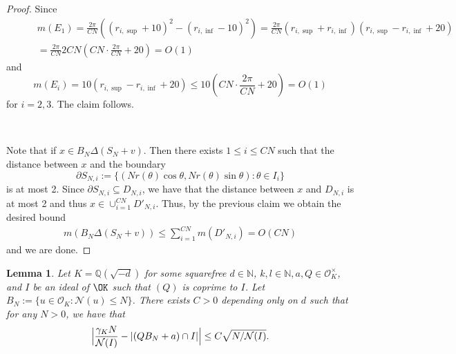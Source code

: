 \documentclass[11pt]{amsart}
\newtheorem{lemma}{Lemma}[section]
\theoremstyle{definition}
\newcommand{\N}{{\mathbb N}}
\newcommand{\NN}{{\mathcal N}}
\newcommand{\Q}{{\mathbb Q}}
\newcommand{\WS}[1]{{\color{blue}{{#1}}}}
\begin{document}
\begin{proof}
Since
\begin{equation*}
    \begin{split}
        \qquad &
        m(E_{1})=\frac{2\pi}{CN}((r_{i,\sup}+10)^{2}-(r_{i,\inf}-10)^{2})
        =\frac{2\pi}{CN}(r_{i,\sup}+r_{i,\inf})(r_{i,\sup}-r_{i,\inf}+20)
       \\& = \frac{2\pi}{CN}2CN(CN\cdot\frac{2\pi}{CN}+20)=O(1)
    \end{split}
\end{equation*}
and
$$m(E_{i})=10 (r_{i,\sup}-r_{i,\inf}+20)\leq 10 (CN\cdot\frac{2\pi}{CN}+20)=O(1)$$
for $i=2,3$. The claim follows.

\


Note that if $x\in B_{N}\Delta (S_{N}+v)$. Then there exists $1\leq i\leq CN$ such that the distance between $x$ and the boundary
$$\partial S_{N,i}:=\{(Nr(\theta)\cos\theta,Nr(\theta)\sin\theta)\colon \theta\in I_{i}\}$$ is at most 2. Since $\partial  S_{N,i}\subseteq D_{N,i}$, we have that the distance between $x$ and $D_{N,i}$ is at most 2 and thus $x\in\cup_{i=1}^{CN}D'_{N,i}$.
Thus, by the previous claim we obtain the desired bound
\begin{equation*}
    \begin{split}
        m(B_{N}\Delta (S_{N}+v))\leq \sum_{i=1}^{CN}m(D'_{N,i})=O(CN)%
    \end{split}
\end{equation*}
and we are done. %
 \end{proof}
 

\begin{lemma}\label{countingCRT}
Let $K=\Q(\sqrt{-d})$ for some squarefree $d\in\N$, $k, l \in \N, a,Q\in\mathcal{O}_K^{\times}$, and $I$ be an ideal of $\OK$ such that $(Q)$ is coprime to $I$. Let $B_N:=\{ u\in\mathcal{O}_{K} : \NN(u) \leq N\}$. There exists $C>0$ depending only on $d$   such that for any $N>0$, we have that 
\begin{equation}\nonumber%
    \Bigl\vert \frac{\gamma_{K} N}{\NN(I)}-\vert(QB_N+a)\cap I|\Bigr\vert\leq C\sqrt{N/\NN(I)}.
\end{equation}
\end{lemma}
\end{document}
